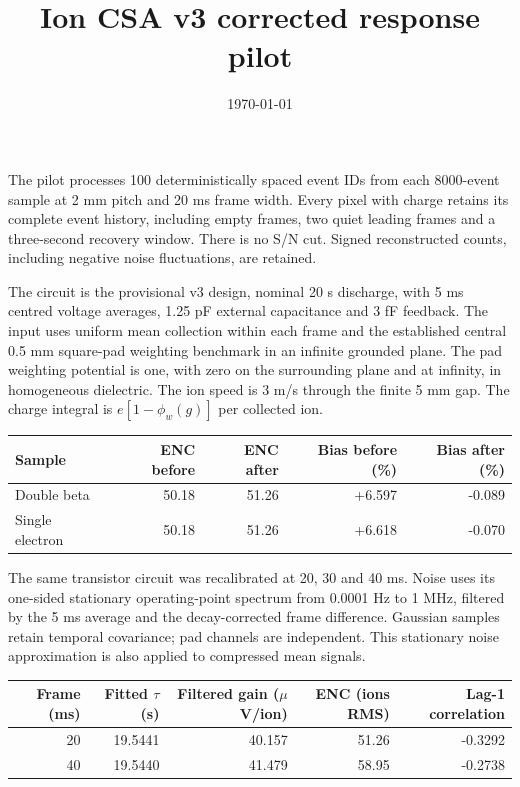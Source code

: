 \documentclass[10pt,a4paper]{article}
\title{Ion CSA v3 corrected response pilot}
\date{\today}
\begin{document}
\maketitle
The pilot processes 100 deterministically spaced event IDs from each 8000-event
sample at 2 mm pitch and 20 ms frame width. Every pixel with charge retains its
complete event history, including empty frames, two quiet leading frames and a
three-second recovery window. There is no S/N cut. Signed reconstructed counts,
including negative noise fluctuations, are retained.

The circuit is the provisional v3 design, nominal 20 s discharge, with 5 ms
centred voltage averages, 1.25 pF external capacitance and 3 fF feedback. The input
uses uniform mean collection within each frame and the established central
0.5 mm square-pad weighting benchmark in an infinite grounded plane. The pad
weighting potential is one, with zero on the surrounding plane and at infinity,
in homogeneous dielectric. The ion speed is 3 m/s through the finite 5 mm gap.
The charge integral is $e[1-\phi_w(g)]$ per collected ion.

\begin{center}\small\begin{tabular}{lrrrr}\toprule Sample & ENC before & ENC after & Bias before (\%) & Bias after (\%)\\\midrule
Double beta & 50.18 & 51.26 & +6.597 & -0.089 \\
Single electron & 50.18 & 51.26 & +6.618 & -0.070 \\\bottomrule\end{tabular}\end{center}

The same transistor circuit was recalibrated at 20, 30 and 40 ms. Noise uses its
one-sided stationary operating-point spectrum from 0.0001 Hz to 1 MHz, filtered
by the 5 ms average and the decay-corrected frame difference. Gaussian samples
retain temporal covariance; pad channels are independent. This stationary noise
approximation is also applied to compressed mean signals.
\begin{center}\begin{tabular}{rrrrr}\toprule
Frame (ms) & Fitted $\tau$ (s) & Filtered gain ($\mu$V/ion) & ENC (ions RMS) & Lag-1 correlation\\\midrule
20 & 19.5441 & 40.157 & 51.26 & -0.3292 \\
40 & 19.5440 & 41.479 & 58.95 & -0.2738 \\
\bottomrule\end{tabular}\end{center}
\end{document}
